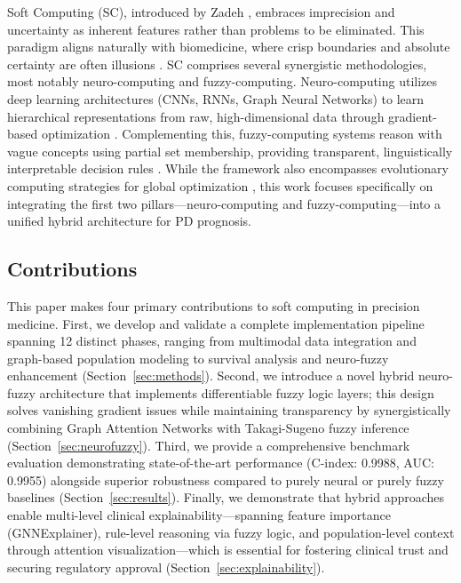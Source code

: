 \documentclass[conference]{IEEEtran}
\begin{document}
Soft Computing (SC), introduced by Zadeh \cite{zadeh1994soft}, embraces imprecision and uncertainty as inherent features rather than problems to be eliminated. This paradigm aligns naturally with biomedicine, where crisp boundaries and absolute certainty are often illusions \cite{torres2006fuzzy}. SC comprises several synergistic methodologies, most notably neuro-computing and fuzzy-computing. Neuro-computing utilizes deep learning architectures (CNNs, RNNs, Graph Neural Networks) to learn hierarchical representations from raw, high-dimensional data through gradient-based optimization \cite{lecun2015deep}. Complementing this, fuzzy-computing systems reason with vague concepts using partial set membership, providing transparent, linguistically interpretable decision rules \cite{zadeh1965fuzzy}. While the framework also encompasses evolutionary computing strategies for global optimization \cite{goldberg1989genetic}, this work focuses specifically on integrating the first two pillars---neuro-computing and fuzzy-computing---into a unified hybrid architecture for PD prognosis.

\subsection{Contributions}

This paper makes four primary contributions to soft computing in precision medicine. First, we develop and validate a complete implementation pipeline spanning 12 distinct phases, ranging from multimodal data integration and graph-based population modeling to survival analysis and neuro-fuzzy enhancement (Section~\ref{sec:methods}). Second, we introduce a novel hybrid neuro-fuzzy architecture that implements differentiable fuzzy logic layers; this design solves vanishing gradient issues while maintaining transparency by synergistically combining Graph Attention Networks with Takagi-Sugeno fuzzy inference (Section~\ref{sec:neurofuzzy}). Third, we provide a comprehensive benchmark evaluation demonstrating state-of-the-art performance (C-index: 0.9988, AUC: 0.9955) alongside superior robustness compared to purely neural or purely fuzzy baselines (Section~\ref{sec:results}). Finally, we demonstrate that hybrid approaches enable multi-level clinical explainability---spanning feature importance (GNNExplainer), rule-level reasoning via fuzzy logic, and population-level context through attention visualization---which is essential for fostering clinical trust and securing regulatory approval (Section~\ref{sec:explainability}).
\end{document}
